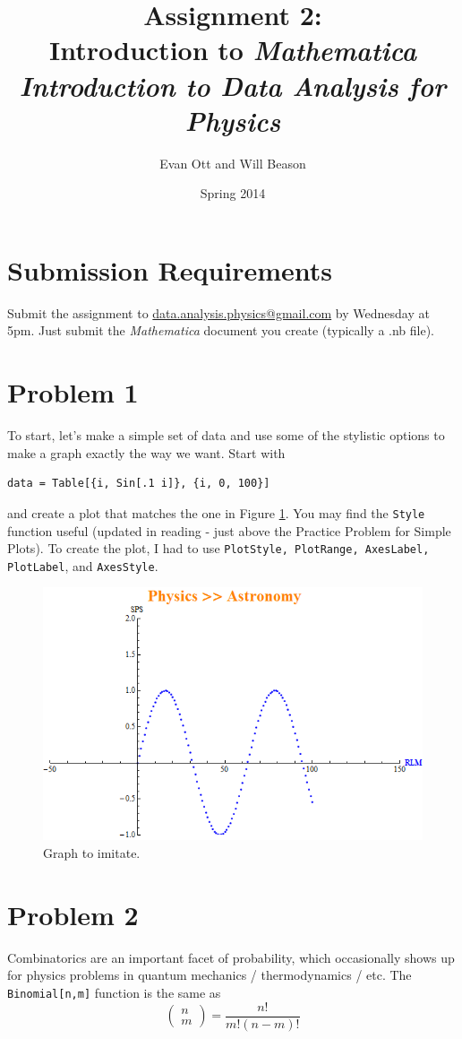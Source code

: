 \documentclass{article}
\title{Assignment 2: \\ Introduction to \emph{Mathematica}\\
\large \emph{Introduction to Data Analysis for Physics}}
\author{Evan Ott and Will Beason}
\date{Spring 2014}
\begin{document}
\maketitle
\section{Submission Requirements}
Submit the assignment to \href{mailto:data.analysis.physics@gmail.com}{data.analysis.physics@gmail.com} by Wednesday at 5pm. Just submit the \emph{Mathematica}
document you create (typically a .nb file).

\section{Problem 1}
To start, let's make a simple set of data and use some of the stylistic options to make a graph exactly the way we want. Start with
\begin{verbatim}
data = Table[{i, Sin[.1 i]}, {i, 0, 100}]
\end{verbatim}
and create a plot that matches the one in Figure \ref{fig:listplot}. You may find the \texttt{Style} function useful (updated in reading - just above the Practice Problem for Simple Plots).
To create the plot, I had to use \texttt{PlotStyle, PlotRange, AxesLabel, PlotLabel}, and \texttt{AxesStyle}.

\begin{figure}
\includegraphics[scale=.6]{physics_astro.png}
\caption{Graph to imitate.}
\label{fig:listplot}
\end{figure}

\section{Problem 2}
Combinatorics are an important facet of probability, which occasionally shows up for physics problems in quantum mechanics / thermodynamics / etc. The \texttt{Binomial[n,m]} function
is the same as $$\left(\begin{array}{c}n\\m\end{array}\right)=\frac{n!}{m!(n-m)!}$$
\end{document}
